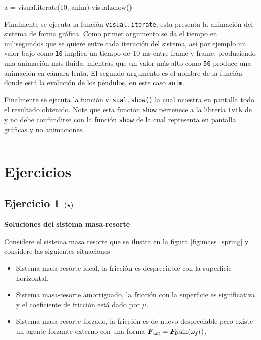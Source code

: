 \begin{listing}[style=python, numbers = none]
a = visual.iterate(10, anim)
visual.show()
\end{listing}
Finalmente se ejecuta la función \texttt{visual.iterate}, esta presenta
la animación del sistema de forma gráfica. Como primer argumento se da el 
tiempo en milisegundos que se quiere entre cada iteración del sistema, así
por ejemplo un valor bajo como \texttt{10} implica un tiempo de $10$ ms 
entre frame y frame, produciendo una animación más fluida, mientras que un
valor más alto como \texttt{50} produce una animación en cámara lenta. El 
segundo argumento es el nombre de la función donde está la evolución de los
péndulos, en este caso \texttt{anim}.


Finalmente se ejecuta la función \texttt{visual.show()} la cual muestra en 
pantalla todo el resultado obtenido. Note que esta función \texttt{show} 
pertenece a la librería \texttt{tvtk} de \mayavi y no debe confundirse con
la función \texttt{show} de \matplotlib la cual representa en pantalla 
gráficas y no animaciones.

\rule{14cm}{0.5mm}



\newpage
\section{Ejercicios}
\label{sec:ejercicios}

\subsection*{Ejercicio 1 \large{$\left( \star \right)$}}

\textbf{Soluciones del sistema masa-resorte}

Considere el sistema masa resorte que se ilustra en la figura 
\ref{fig:mass_spring} y considere las siguientes situaciones

\begin{itemize}
\item Sistema masa-resorte ideal, la fricción es despreciable con la 
superficie horizontal.
\item Sistema masa-resorte amortiguado, la fricción con la superficie es
significativa y el coeficiente de fricción está dado por $\mu$.
\item Sistema masa-resorte forzado, la fricción es de nuevo despreciable 
pero e\-xiste un agente forzante externo con una forma $\boldsymbol{ F }_{ext} = 
\boldsymbol{ F_0 } \sin (\omega_f t)$.
\end{itemize}

